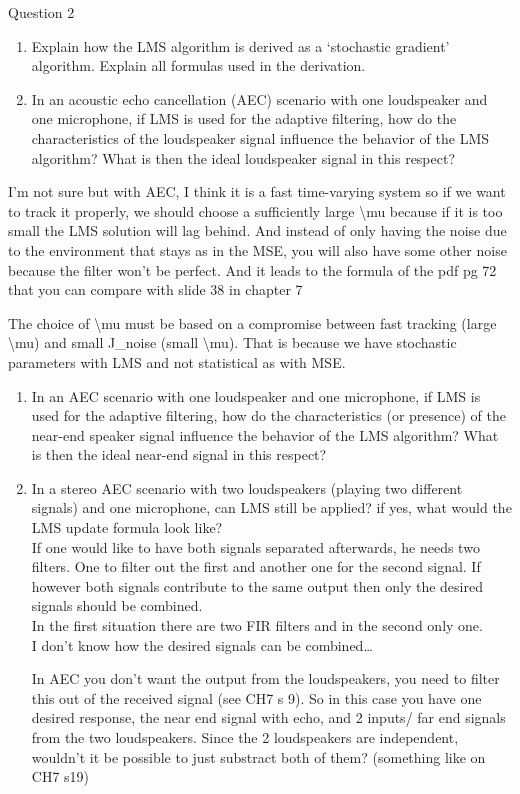 \documentclass[
  a4paper,
  ,captions=tableheading
]{scrartcl}
\providecommand{\tightlist}{%
  \setlength{\itemsep}{0pt}\setlength{\parskip}{0pt}}
\begin{document}
Question 2

\begin{enumerate}
\def\labelenumi{\arabic{enumi}.}
\tightlist
\item
  Explain how the LMS algorithm is derived as a `stochastic gradient'
  algorithm. Explain all formulas used in the derivation.\\
\item
  In an acoustic echo cancellation (AEC) scenario with one loudspeaker
  and one microphone, if LMS is used for the adaptive filtering, how do
  the characteristics of the loudspeaker signal influence the behavior
  of the LMS algorithm? What is then the ideal loudspeaker signal in
  this respect?
\end{enumerate}

I'm not sure but with AEC, I think it is a fast time-varying system so
if we want to track it properly, we should choose a sufficiently large
\textbackslash mu because if it is too small the LMS solution will lag
behind. And instead of only having the noise due to the environment that
stays as in the MSE, you will also have some other noise because the
filter won't be perfect. And it leads to the formula of the pdf pg 72
that you can compare with slide 38 in chapter 7

The choice of \textbackslash mu must be based on a compromise between
fast tracking (large \textbackslash mu) and small J\_noise (small
\textbackslash mu). That is because we have stochastic parameters with
LMS and not statistical as with MSE.

\begin{enumerate}
\def\labelenumi{\arabic{enumi}.}
\setcounter{enumi}{2}
\item
  In an AEC scenario with one loudspeaker and one microphone, if LMS is
  used for the adaptive filtering, how do the characteristics (or
  presence) of the near-end speaker signal influence the behavior of the
  LMS algorithm? What is then the ideal near-end signal in this respect?
\item
  In a stereo AEC scenario with two loudspeakers (playing two different
  signals) and one microphone, can LMS still be applied? if yes, what
  would the LMS update formula look like?\\
  If one would like to have both signals separated afterwards, he needs
  two filters. One to filter out the first and another one for the
  second signal. If however both signals contribute to the same output
  then only the desired signals should be combined.\\
  In the first situation there are two FIR filters and in the second
  only one.\\
  I don't know how the desired signals can be combined\ldots{}

  In AEC you don't want the output from the loudspeakers, you need to
  filter this out of the received signal (see CH7 s 9). So in this case
  you have one desired response, the near end signal with echo, and 2
  inputs/ far end signals from the two loudspeakers. Since the 2
  loudspeakers are independent, wouldn't it be possible to just
  substract both of them? (something like on CH7 s19)
\end{enumerate}
\end{document}
